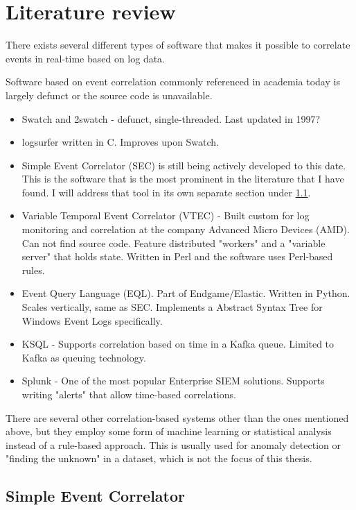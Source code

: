 \chapter{Literature review}
\label{chap:literaturereview}

There exists several different types of software that makes it possible to correlate events in real-time based on log data.

Software based on event correlation commonly referenced in academia today is largely defunct or the source code is unavailable. 

\begin{itemize}
    \item Swatch and 2swatch - defunct, single-threaded. Last updated in 1997?
    \item logsurfer \cite{thompson_2017} written in C. Improves upon Swatch.
    \item Simple Event Correlator (SEC) is still being actively developed to this date. This is the software that is the most prominent in the literature that I have found. I will address that tool in its own separate section under \ref{sec:SEC}.
    \item Variable Temporal Event Correlator (VTEC) - Built custom for log monitoring and correlation at the company Advanced Micro Devices (AMD). Can not find source code. Feature distributed "workers" and a "variable server" that holds state. Written in Perl and the software uses Perl-based rules.
    \item Event Query Language (EQL). Part of Endgame/Elastic. Written in Python. Scales vertically, same as SEC. Implements a Abstract Syntax Tree for Windows Event Logs specifically.
    \item KSQL - Supports correlation based on time in a Kafka queue. Limited to Kafka as queuing technology.
    \item Splunk - One of the most popular Enterprise SIEM solutions. Supports writing "alerts" that allow time-based correlations.
\end{itemize}
There are several other correlation-based systems other than the ones mentioned above, but they employ some form of machine learning or statistical analysis instead of a rule-based approach. This is usually used for anomaly detection or "finding the unknown" in a dataset, which is not the focus of this thesis.

\section{Simple Event Correlator}
\label{sec:SEC}

